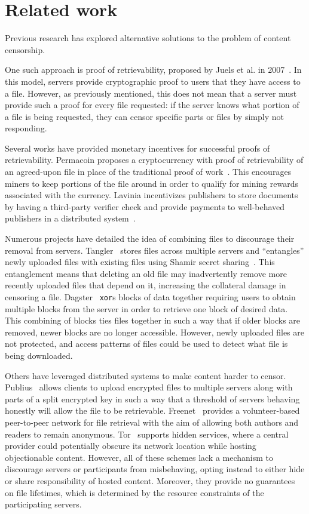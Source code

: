 \section{Related work}

Previous research has explored alternative solutions to the problem of content
censorship.

One such approach is proof of retrievability, proposed by
Juels et al. in 2007~\cite{juels2007pors}. In this model, servers provide
cryptographic proof to users that they have access to a file. However, as
previously mentioned, this does not mean that a server must provide such a proof
for every file requested: if the server knows what portion of a file is being
requested, they can censor specific parts or files by simply not responding.

Several works have provided monetary incentives for successful proofs of
retrievability. Permacoin proposes a cryptocurrency with proof of retrievability
of an agreed-upon file in place of the traditional proof of
work~\cite{permacoin}. This encourages miners to keep portions of the file
around in order to qualify for mining rewards associated with the currency.
Lavinia incentivizes publishers to store documents by having a
third-party verifier check and provide payments to well-behaved
publishers in a distributed system~\cite{lavinia}.

Numerous projects have detailed the idea of combining files to
discourage their removal from servers. Tangler~\cite{tangler} stores files
across multiple servers and ``entangles''
newly uploaded files with existing files using Shamir secret
sharing~\cite{shamirsharing}. This entanglement means that deleting an old file may
inadvertently remove more recently uploaded files that depend on it, increasing
the collateral damage in censoring a file. Dagster~\cite{dagster} \texttt{xor}s
blocks of data together requiring users to obtain multiple blocks from the
server in order to retrieve one block of desired data. This combining of blocks
ties files together in such a way that if older blocks are removed, newer blocks
are no longer accessible. However, newly uploaded files are not protected, and access
patterns of files could be used to detect what file is being downloaded.

Others have leveraged distributed systems to make content harder to
censor. Publius~\cite{publius} allows clients to upload encrypted files to
multiple servers along with parts of a split encrypted key in such a way
that a threshold of servers behaving honestly will allow the file to be
retrievable.  Freenet~\cite{freenet} provides a volunteer-based peer-to-peer
network for file retrieval with the aim of allowing both authors and readers to
remain anonymous. Tor~\cite{tor} supports hidden services, where a central
provider
could potentially obscure its network location while hosting objectionable content.
However, all of these schemes lack a mechanism to discourage servers or participants
from misbehaving, opting instead to either hide or share responsibility of hosted content.
Moreover, they provide no guarantees on file lifetimes, which is determined by
the resource constraints of the participating servers.

